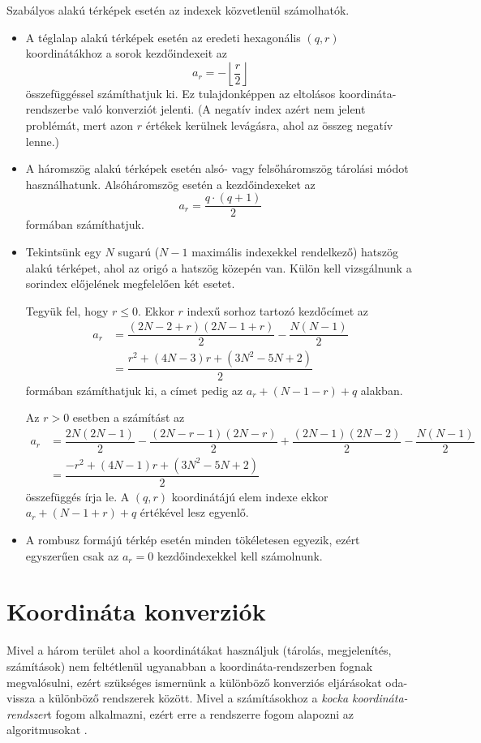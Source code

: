 Szabályos alakú térképek esetén az indexek közvetlenül számolhatók.
\begin{itemize}
\item A téglalap alakú térképek esetén az eredeti hexagonális $(q, r)$ koordinátákhoz a sorok kezdőindexeit az
$$
a_r = - \left\lfloor \dfrac{r}{2} \right\rfloor
$$
összefüggéssel számíthatjuk ki. Ez tulajdonképpen az eltolásos koordináta-rend\-szer\-be való konverziót jelenti. (A negatív index azért nem jelent problémát, mert azon $r$ értékek kerülnek levágásra, ahol az összeg negatív lenne.)
\item A háromszög alakú térképek esetén alsó- vagy felsőháromszög tárolási módot használhatunk. Alsóháromszög esetén a kezdőindexeket az
$$
a_r = \dfrac{q \cdot (q + 1)}{2}
$$
formában számíthatjuk.
\item Tekintsünk egy $N$ sugarú ($N - 1$ maximális indexekkel rendelkező) hatszög alakú térképet, ahol az origó a hatszög közepén van. Külön kell vizsgálnunk a sorindex előjelének megfelelően két esetet.

Tegyük fel, hogy $r \leq 0$. Ekkor $r$ indexű sorhoz tartozó kezdőcímet az
\begin{align*}
a_r &=
\dfrac{
(2N - 2 + r)(2N - 1 + r)
}{2}
-
\dfrac{
N(N - 1)
}{2} \\
&=
\dfrac{r^2 + (4N - 3)r + (3N^2 - 5N + 2)}{2}
\end{align*}
formában számíthatjuk ki, a címet pedig az $a_r + (N - 1 -r) + q$ alakban.

Az $r > 0$ esetben a számítást az
\begin{align*}
a_r &=
\dfrac{2N(2N - 1)}{2} -
\dfrac{(2N - r - 1)(2N - r)}{2} +
\dfrac{(2N - 1)(2N - 2)}{2} -
\dfrac{N(N - 1)}{2} \\
&=
\dfrac{-r^2 + (4N - 1)r + (3N^2 - 5N + 2)}
{2}
\end{align*}
összefüggés írja le. A $(q, r)$ koordinátájú elem indexe ekkor $a_r + (N - 1 + r) + q$ értékével lesz egyenlő.
\item A rombusz formájú térkép esetén minden tökéletesen egyezik, ezért egyszerűen csak az $a_r = 0$ kezdőindexekkel kell számolnunk.
\end{itemize}

\section{Koordináta konverziók}

Mivel a három terület ahol a koordinátákat használjuk (tárolás, megjelenítés, számítások) nem feltétlenül ugyanabban a koordináta-rendszerben fognak megvalósulni, ezért szükséges ismernünk a különböző konverziós eljárásokat oda-vissza a különböző rendszerek között. Mivel a számításokhoz a \textit{kocka koordináta-rendszer}t fogom alkalmazni, ezért erre a rendszerre fogom alapozni az algoritmusokat \cite{Conversion}.

